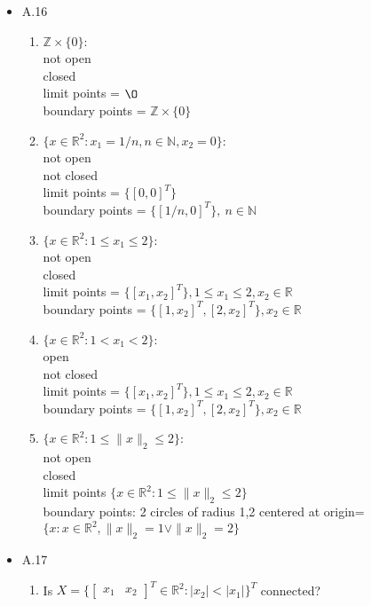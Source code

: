 \documentclass[12pt,letter]{article}
\newcommand{\R}{\mathbb{R}}
\newcommand{\Z}{\mathbb{Z}}
\newcommand{\N}{\mathbb{N}}
\begin{document}
\begin{itemize}
\item A.16
  \begin{enumerate}
  \item $\Z\times\{0\}$:\\
    not open\\
    closed\\
    limit points = $\O$\\
    boundary points = $\Z\times\{0\}$\\
  \item $\{x\in\R^2: x_1=1/n, n\in\N,x_2=0\}$:\\
    not open\\
    not closed\\
    limit points = $\{[0,0]^T\}$\\
    boundary points = $\{[1/n,0]^T\},\ n\in\N$\\
  \item $\{x\in\R^2: 1\leq x_1\leq2\}$:\\
    not open\\
    closed\\
    limit points = $\{[x_1,x_2]^T\}, 1\leq x_1\leq2, x_2\in\R$\\
    boundary points = $\{[1,x_2]^T, [2,x_2]^T\}, x_2\in\R$\\
  \item $\{x\in\R^2: 1<x_1<2\}$:\\
    open\\
    not closed\\
    limit points = $\{[x_1,x_2]^T\}, 1\leq x_1\leq2, x_2\in\R$\\
    boundary points = $\{[1,x_2]^T, [2,x_2]^T\}, x_2\in\R$\\
  \item $\{x\in\R^2: 1\leq\|x\|_2\leq2\}$:\\
    not open\\
    closed\\
    limit points $\{x\in\R^2: 1\leq\|x\|_2\leq2\}$\\
    boundary points: 2 circles of radius 1,2 centered at origin=$\{x: x\in\R^2, \|x\|_2=1 \vee \|x\|_2=2 \}$\\
  \end{enumerate}

\item A.17
  
  \begin{enumerate}
    \item
  Is $X=\{\begin{bmatrix}x_1 & x_2\end{bmatrix}^T\in\R^2: |x_2|<|x_1|\}^T$ connected?\\


\end{enumerate}
\end{itemize}
\end{document}
